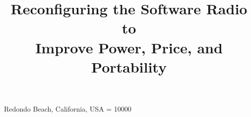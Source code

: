 \documentclass{sig-alternate}
\begin{document}
 {Redondo Beach, California, USA}
\widowpenalty = 10000

\title{Reconfiguring the Software Radio to\\Improve Power, Price, and
  Portability}


\author{
}

\maketitle

\begin{abstract}

\end{abstract}

\begin{comment}
\category{B.4.1}{HARDWARE}{Input/Output and Data
  Communications}[Input/Output Devices]
\category{C.3}{COMPUTER SYSTEMS ORGANIZATION}{Spe\-cial-Purpose and App\-li\-cation-Based Systems}
\terms{Design, Experimentation, Measurement, Performance}
\keywords{Software-Defined Radio, IEEE 802.15.4} 
\end{comment}





{%
\raggedright


}
\end{document}
